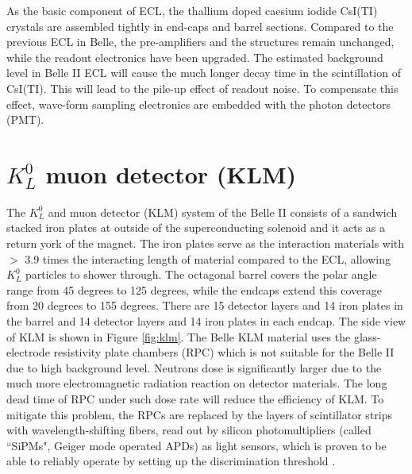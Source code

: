 As the basic component of ECL, the  thallium doped caesium iodide CsI(TI) crystals are assembled tightly in end-caps and barrel sections. Compared to the previous ECL in Belle, the pre-amplifiers and the structures remain unchanged, while the readout  electronics have been upgraded. The estimated background level in Belle II ECL will cause the much longer decay time in the scintillation of CsI(TI). This will lead to the pile-up effect of readout noise. To compensate this effect, wave-form sampling electronics are embedded with the photon detectors (PMT).
 
\begin{comment}
Especially in the forward direction of the electron beamline, where the level of beam background is much higher, the effect of pile-up noise becomes even worse and the performance of ECL will be of trouble if no special measure taken. Therefore, the pure CsI crystal is considered to be chosen as the material of detector to achieve a fast wave-shaping time and higher radiation tolerance compared to the dosed CsI(TI), which is an back-up option for the future upgrade. ECL is the most important detector for providing trigger information for low multiplicity events, since the main feature of these events is one or two energetic photon(s) emitted from IP region while the charged tracks are missing. 
\end{comment}
  

\section{$K_L^0$ muon detector (KLM)}
The $K_L^0$ and muon detector (KLM) system of the Belle II consists of a sandwich stacked iron plates at outside of the superconducting solenoid and it acts as a return york of the magnet. The iron plates serve as the interaction materials with $>$ 3.9 times the interacting length of material compared to the ECL, allowing $K_L^0$ particles to shower through. The octagonal barrel covers the polar angle range from 45 degrees to 125 degrees, while the endcaps extend
this coverage from 20 degrees to 155 degrees. There are 15 detector layers and 14 iron plates in the barrel and
14 detector layers and 14 iron plates in each endcap. The side view of KLM is shown in Figure \ref{fig:klm}.
The Belle KLM material uses the glass-electrode resistivity plate chambers (RPC) which is not suitable for the Belle II due to high background level.  Neutrons dose is significantly larger due to the much more electromagnetic radiation reaction on detector materials. The long dead time of RPC under such dose rate will reduce the efficiency of KLM. To mitigate this problem, the RPCs are replaced by the layers of scintillator strips with wavelength-shifting ﬁbers, read out by silicon photomultipliers (called ``SiPMs", Geiger mode operated APDs) as light sensors, which is proven to be able to reliably operate by setting up the discrimination threshold \cite{b2book}.

